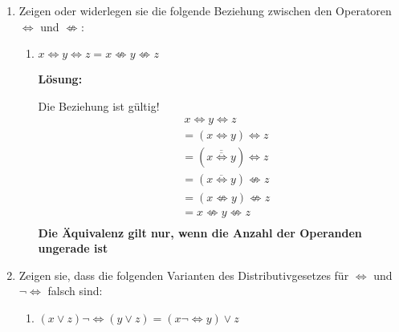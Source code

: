 \documentclass[paper=a4,fontsize=11pt]{scrartcl}%
\numberwithin{equation}{section}
\newenvironment{solution}
	{
		\color{Blue}
		\textbf{Lösung:}
	}{}
\begin{document}
\begin{enumerate}
\begin{enumerate}
\begin{solution}
\begin{align*}
		&= x_1  \overline{x_2}  \overline{x_3} \overline{x_4} \lor \textcolor{red}{x_1 x_2  \overline{x_3}
x_1 \overline{x_3} } \lor x_2 \overline{x_4} \lor x_1 \overline{x_3} x_4 \lor \overline{x_1} x_2  \overline{x_3} \overline{x_4} \lor x_2 x_3 \overline{x_4}\\
		&= x_1 \overline{x_3} \overline{x_4} \lor x_1 \overline{x_3} x_4 \lor \textcolor{red}{\overline{x_1} x_2 \overline{x_3} \overline{x_4} } \lor x_2 x_3 \overline{x_4}\\
		&= \textcolor{red}{x_1 \overline{x_3} \overline{x_4} \lor x_1 \overline{x_3} x_4} \lor x_2 \overline{x_3} \overline{x_4} \lor x_2 x_3 \overline{x_4}\\
		&= x_1 \overline{x_3} \lor \textcolor{red}{x_2 \overline{x_3} \overline{x_4} \lor x_2 x_3 \overline{x_4}}\\
		&= x_1 \overline{x_3} \lor x_2 \overline{x_4}
		\end{align*}
		\end{solution}
	\end{enumerate}
	\item Zeigen oder widerlegen sie die folgende Beziehung zwischen den Operatoren $\Leftrightarrow$ und $\not\Leftrightarrow$:
	\begin{enumerate}
		\item $x \Leftrightarrow y \Leftrightarrow z = x \not\Leftrightarrow y \not\Leftrightarrow z$
		
		\begin{solution}
		
		Die Beziehung ist gültig!
		\begin{align*}
		&~ x \Leftrightarrow y \Leftrightarrow z \\
		&= (x \Leftrightarrow y) \Leftrightarrow z \\
		&= (\overline{\overline{x \Leftrightarrow y}}) \Leftrightarrow z\\
		&= (\overline{x \Leftrightarrow y}) \not \Leftrightarrow z\\
		&= (x \not \Leftrightarrow y) \not \Leftrightarrow z\\
		&= x \not \Leftrightarrow y \not \Leftrightarrow z\\
		\end{align*}
		\textbf{Die Äquivalenz gilt nur, wenn die Anzahl der Operanden ungerade ist}
		\end{solution}
	\end{enumerate}
	\item Zeigen sie, dass die folgenden Varianten des Distributivgesetzes für $\Leftrightarrow$ und $\neg \Leftrightarrow$ falsch sind:
	\begin{enumerate}[resume]
		\item $(x \lor z) \neg \Leftrightarrow (y \lor z) = (x \neg \Leftrightarrow y) \lor z$
		

\end{enumerate}
\end{enumerate}
\end{document}
